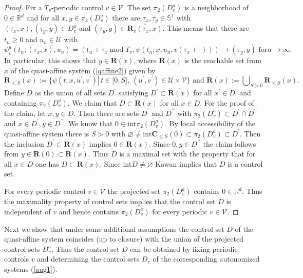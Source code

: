 \documentclass{siamltex}%
\begin{document}
\begin{proof}
Fix a $T_{v}$-periodic control $v\in\mathcal{V}$. The set $\pi_{2}(D_{v}^{a})$
is a neighborhood of $0\in\mathbb{R}^{d}$ and for all $x,y\in\pi_{2}(D_{v}%
^{a})$ there are $\tau_{x},\tau_{y}\in\mathbb{S}^{1}$ with $(\tau_{x}%
,x),(\tau_{y},y)\in D_{v}^{a}$ and $(\tau_{y},y)\in\overline{\mathbf{R}%
_{v}(\tau_{x},x)}$. This means that there are $t_{n}\geq0$ and $u_{n}%
\in\mathcal{U}$ with%
\[
\psi_{v}^{a}(t_{n};(\tau_{x},x),u_{n})=(t_{n}+\tau_{x}\operatorname{mod}%
T_{v},\psi(t_{n};x,u_{n},v(\tau_{x}+\cdot)))\rightarrow(\tau_{y},y)\text{ for
}n\rightarrow\infty.
\]
In particular, this shows that $y\in\overline{\mathbf{R}(x)}$, where
$\mathbf{R}(x)$ is the reachable set from $x$ of the quasi-affine system
(\ref{qaffine2}) given by%
\[
\mathbf{R}_{\leq S}(x):=\{\psi(t;x,u^{\prime},v^{\prime})\left\vert
\,t\in\lbrack0,S],~(u^{\prime},v^{\prime})\in\mathcal{U}\times\mathcal{V}%
\right.  \}\text{ and }\mathbf{R}(x):=\bigcup\nolimits_{S>0}\mathbf{R}_{\leq
S}(x).
\]
Define $D$ as the union of all sets $D^{\prime}$ satisfying $D^{\prime}%
\subset\overline{\mathbf{R}(x)}$ for all $x^{\prime}\in D^{\prime}$ and
containing $\pi_{2}(D_{v}^{a})$. We claim that $D\subset\overline
{\mathbf{R}(x)}$ for all $x\in D$. For the proof of the claim, let $x,y\in D$.
Then there are sets $D^{\prime}$ and $D^{\prime\prime}$ with $\pi_{2}%
(D_{v}^{a})\subset D^{\prime}\cap D^{\prime\prime}$ and $x\in D^{\prime},y\in
D^{\prime\prime}$. We know that $0\in\mathrm{int}\pi_{2}(D_{v}^{a})$. By local
accessibility of the quasi-affine system there is $S>0$ with $\varnothing
\not =\mathrm{int}\mathbf{C}_{\leq S}(0)\subset\pi_{2}(D_{v}^{a})\subset
D^{\prime}$. Then the inclusion $D^{\prime}\subset\overline{\mathbf{R}(x)}$
implies $0\in\mathbf{R}(x)$. Since $0,y\in D^{\prime\prime}$ the claim follows
from $y\in\overline{\mathbf{R}(0)}\subset\overline{\mathbf{R}(x)}$. Thus $D$
is a maximal set with the property that for all $x\in D$ one has
$D\subset\overline{\mathbf{R}(x)}$. Since $\mathrm{int}D\not =\varnothing$
Kawan \cite[Proposition 1.20]{Kawa13} implies that $D$ is a control set.

For every periodic control $v\in\mathcal{V}$ the projected set $\pi_{2}%
(D_{v}^{a})$ contains $0\in\mathbb{R}^{d}$. Thus the maximality property of
control sets implies that the control set $D$ is independent of $v$ and hence
contains $\pi_{2}(D_{v}^{a})$ for every periodic $v\in\mathcal{V}$.
\end{proof}

Next we show that under some additional assumptions the control set $D$ of the
quasi-affine system coincides (up to closure) with the union of the projected
control sets $D_{v}^{a}$. Thus the control set $D$ can be obtained by fixing
periodic controls $v$ and determining the control sets $D_{v}$ of the
corresponding autonomized systems (\ref{aug1}).
\end{document}
